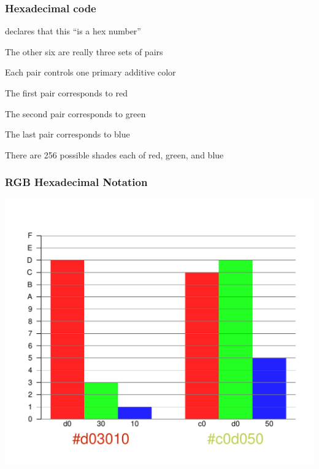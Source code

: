 \documentclass[12pt]{beamer}\usepackage[]{graphicx}\usepackage[]{color}
\newenvironment{knitrout}{}{} %
\begin{document}

\begin{frame}
\frametitle{Hexadecimal code}

 \bi
  \item {\hilit \code{\#}} declares that this ``is a hex number''
  \item The other six are really three sets of pairs
  \item Each pair controls one primary additive color
  \item The first pair corresponds to red
  \item The second pair corresponds to green
  \item The last pair corresponds to blue
 \ei
\eb

\end{frame}


\begin{frame}[fragile]
\begin{center}
\end{center}
There are 256 possible shades each of red, green, and blue
\end{frame}


\begin{frame}[fragile]
\frametitle{RGB Hexadecimal Notation}

\begin{knitrout}\scriptsize
{}\color{fgcolor}

{\centering \includegraphics[width=.7\linewidth,height=.6\linewidth]{figure/unnamed-chunk-8-1} 

}



\end{knitrout}

\end{frame}
\end{document}
